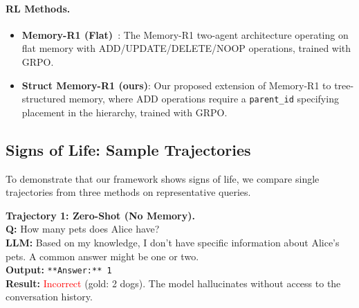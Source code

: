 \documentclass{article}
\theoremstyle{definition}
\begin{document}
\paragraph{RL Methods.}
\begin{itemize}[nosep]
    \item \textbf{Memory-R1 (Flat)}~\citep{yan2025memory}: The Memory-R1 two-agent architecture operating on flat memory with ADD/UPDATE/DELETE/NOOP operations, trained with GRPO.
    \item \textbf{Struct Memory-R1 (ours)}: Our proposed extension of Memory-R1 to tree-structured memory, where ADD operations require a \texttt{parent\_id} specifying placement in the hierarchy, trained with GRPO.
\end{itemize}

\subsection{Signs of Life: Sample Trajectories}

To demonstrate that our framework shows signs of life, we compare single trajectories from three methods on representative queries.

\begin{tcolorbox}[aclbox, width=\linewidth]
\small
\textbf{Trajectory 1: Zero-Shot (No Memory).}\\[2pt]
\textbf{Q:} How many pets does Alice have?\\[2pt]
\textbf{LLM:} Based on my knowledge, I don't have specific information about Alice's pets. A common answer might be one or two.\\[2pt]
\textbf{Output:} \texttt{**Answer:** 1}\\[2pt]
\textbf{Result:} \textcolor{red}{Incorrect} (gold: 2 dogs). The model hallucinates without access to the conversation history.
\end{tcolorbox}
\end{document}
